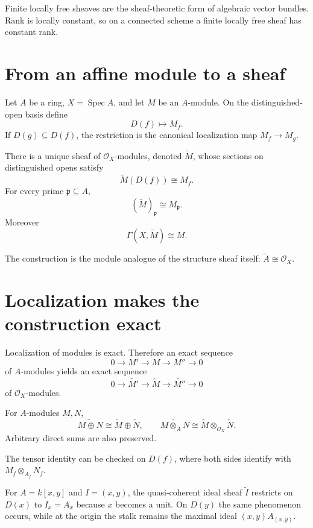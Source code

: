 Finite locally free sheaves are the sheaf-theoretic form of algebraic vector bundles.  Rank is locally constant, so on a connected scheme a finite locally free sheaf has constant rank.



\section{From an affine module to a sheaf}
Let $A$ be a ring, $X=\operatorname{Spec}A$, and let $M$ be an $A$-module.  On the distinguished-open basis define
\[
D(f)\longmapsto M_f.
\]
If $D(g)\subseteq D(f)$, the restriction is the canonical localization map $M_f\to M_g$.

\begin{theorem}
There is a unique sheaf of $\mathcal O_X$-modules, denoted $\widetilde M$, whose sections on distinguished opens satisfy
\[
\boxed{\widetilde M(D(f))\cong M_f.}
\]
For every prime $\mathfrak p\subseteq A$,
\[
\boxed{(\widetilde M)_{\mathfrak p}\cong M_{\mathfrak p}.}
\]
Moreover
\[
\Gamma(X,\widetilde M)\cong M.
\]
\end{theorem}

The construction is the module analogue of the structure sheaf itself: $\widetilde A\cong\mathcal O_X$.



\section{Localization makes the construction exact}
Localization of modules is exact.  Therefore an exact sequence
\[
0\to M'\to M\to M''\to0
\]
of $A$-modules yields an exact sequence
\[
0\to\widetilde{M'}\to\widetilde M\to\widetilde{M''}\to0
\]
of $\mathcal O_X$-modules.

\begin{proposition}
For $A$-modules $M,N$,
\[
\widetilde{M\oplus N}\cong\widetilde M\oplus\widetilde N,
\qquad
\widetilde{M\otimes_A N}\cong\widetilde M\otimes_{\mathcal O_X}\widetilde N.
\]
Arbitrary direct sums are also preserved.
\end{proposition}

The tensor identity can be checked on $D(f)$, where both sides identify with $M_f\otimes_{A_f}N_f$.

\begin{example}\label{ex:vi33-expand-02}
For $A=k[x,y]$ and $I=(x,y)$, the quasi-coherent ideal sheaf $\widetilde I$ restricts on $D(x)$ to $I_x=A_x$ because $x$ becomes a unit.  On $D(y)$ the same phenomenon occurs, while at the origin the stalk remains the maximal ideal $(x,y)A_{(x,y)}$.
\end{example}
